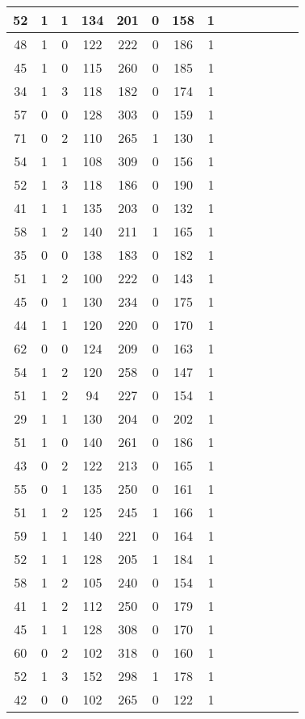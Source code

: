\documentclass{article}
\begin{document}
\begin{center}
\begin{longtable}{|c|c|c|c|c|c|c|c|c|c|c|c|c|c|}
\hline
52 & 1 & 1 & 134 & 201 & 0 & 158 & 1 \\
\hline
48 & 1 & 0 & 122 & 222 & 0 & 186 & 1 \\
\hline
45 & 1 & 0 & 115 & 260 & 0 & 185 & 1 \\
\hline
34 & 1 & 3 & 118 & 182 & 0 & 174 & 1 \\
\hline
57 & 0 & 0 & 128 & 303 & 0 & 159 & 1 \\
\hline
71 & 0 & 2 & 110 & 265 & 1 & 130 & 1 \\
\hline
54 & 1 & 1 & 108 & 309 & 0 & 156 & 1 \\
\hline
52 & 1 & 3 & 118 & 186 & 0 & 190 & 1 \\
\hline
41 & 1 & 1 & 135 & 203 & 0 & 132 & 1 \\
\hline
58 & 1 & 2 & 140 & 211 & 1 & 165 & 1 \\
\hline
35 & 0 & 0 & 138 & 183 & 0 & 182 & 1 \\
\hline
51 & 1 & 2 & 100 & 222 & 0 & 143 & 1 \\
\hline
45 & 0 & 1 & 130 & 234 & 0 & 175 & 1 \\
\hline
44 & 1 & 1 & 120 & 220 & 0 & 170 & 1 \\
\hline
62 & 0 & 0 & 124 & 209 & 0 & 163 & 1 \\
\hline
54 & 1 & 2 & 120 & 258 & 0 & 147 & 1 \\
\hline
51 & 1 & 2 & 94 & 227 & 0 & 154 & 1 \\
\hline
29 & 1 & 1 & 130 & 204 & 0 & 202 & 1 \\
\hline
51 & 1 & 0 & 140 & 261 & 0 & 186 & 1 \\
\hline
43 & 0 & 2 & 122 & 213 & 0 & 165 & 1 \\
\hline
55 & 0 & 1 & 135 & 250 & 0 & 161 & 1 \\
\hline
51 & 1 & 2 & 125 & 245 & 1 & 166 & 1 \\
\hline
59 & 1 & 1 & 140 & 221 & 0 & 164 & 1 \\
\hline
52 & 1 & 1 & 128 & 205 & 1 & 184 & 1 \\
\hline
58 & 1 & 2 & 105 & 240 & 0 & 154 & 1 \\
\hline
41 & 1 & 2 & 112 & 250 & 0 & 179 & 1 \\
\hline
45 & 1 & 1 & 128 & 308 & 0 & 170 & 1 \\
\hline
60 & 0 & 2 & 102 & 318 & 0 & 160 & 1 \\
\hline
52 & 1 & 3 & 152 & 298 & 1 & 178 & 1 \\
\hline
42 & 0 & 0 & 102 & 265 & 0 & 122 & 1 \\

\end{longtable}
\end{center}
\end{document}
